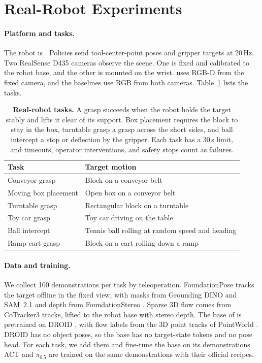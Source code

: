 \section{Real-Robot Experiments}
\label{app:real}

\paragraph{Platform and tasks.}
\label{app:real_platform}
The robot is \cfgRobot{}. Policies send tool-center-point poses and gripper targets at 20\,Hz. Two RealSense D435 cameras observe the scene. One is fixed
and calibrated to the robot base, and the other is mounted on the wrist.
\ours uses RGB-D from the fixed camera, and the baselines use RGB from both cameras.
Table~\ref{tab:real_tasks} lists the tasks.

\begin{table}[!htbp]
\centering\footnotesize
\caption{\textbf{Real-robot tasks.} A grasp succeeds when the robot holds the target
stably and lifts it clear of its support. Box placement requires the block to stay in the
box, turntable grasp a grasp across the short sides, and ball intercept a stop or deflection
by the gripper. Each task has a 30\,s limit, and timeouts, operator interventions, and
safety stops count as failures.}
\label{tab:real_tasks}
\setlength{\tabcolsep}{4pt}
\begin{tabularx}{\linewidth}{@{}l>{\raggedright\arraybackslash}X@{}}
\toprule
Task & Target motion \\
\midrule
Conveyor grasp & Block on a conveyor belt \\
Moving box placement & Open box on a conveyor belt \\
Turntable grasp & Rectangular block on a turntable \\
Toy car grasp & Toy car driving on the table \\
Ball intercept & Tennis ball rolling at random speed and heading \\
Ramp cart grasp & Block on a cart rolling down a ramp \\
\bottomrule
\end{tabularx}
\end{table}

\paragraph{Data and training.}
\label{app:tracker}
\label{app:lifting}
\label{app:posttraining}
We collect 100 demonstrations per task by teleoperation. FoundationPose
\cite{foundationpose} tracks the target offline in the fixed view, with masks from Grounding DINO \cite{groundingdino} and SAM~2.1 \cite{sam2} and depth
from FoundationStereo \cite{foundationstereo}. Sparse 3D flow comes from CoTracker3
\cite{cotracker3} tracks, lifted to the robot base with stereo depth. The base of \ours
is pretrained on DROID \cite{droid}, with flow labels from the 3D point tracks of PointWorld \cite{pointworld}. DROID has no object poses, so the base has no
target-state tokens and no pose head. For each task, we add them and fine-tune the base on its demonstrations. ACT and $\pi_{0.5}$ are trained on the same
demonstrations with their official recipes.

